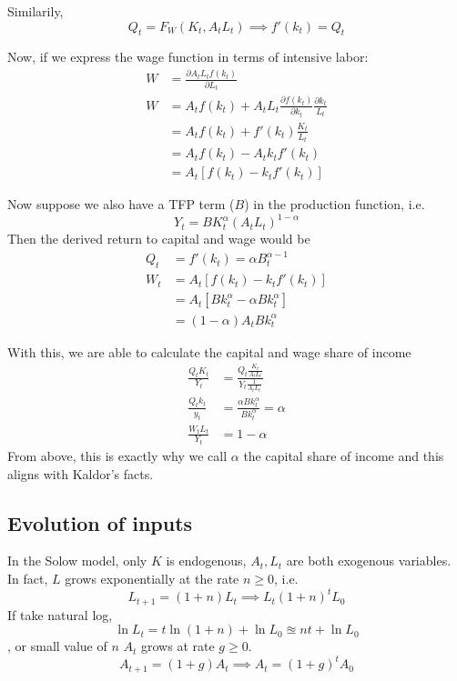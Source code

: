 \documentclass[twocolumn, fleqn]{article}
\begin{document}
			Similarily, \[Q_t = F_W(K_t,A_t L_t) \implies f'(k_t)=Q_t\]

			Now, if we express the wage function in terms of intensive labor:
			\begin{align*}
				W &= \frac{\partial A_t L_t f(k_t)}{\partial L_t}\\
				W &= A_t f(k_t) + A_t L_t \frac{\partial f(k_t)}{\partial k_t}\frac{\partial k_t}{L_t}\\
				&= A_t f(k_t) + f'(k_t) \frac{K_t}{L_t}\\
				&= A_t f(k_t) - A_t k_t f'(k_t)\\[4pt]
				&= A_t [f(k_t)-k_t f'(k_t)]
			\end{align*}

			Now suppose we also have a TFP term ($B$) in the production function, i.e.
			\[Y_t = B K_t^\alpha (A_t L_t)^{1-\alpha}\]
			Then the derived return to capital and wage would be
			\begin{align*}
				Q_t &= f'(k_t) = \alpha B_t ^{\alpha-1}\\[4pt]
				W_t &= A_t [f(k_t)-k_t f'(k_t)]\\
				&= A_t [B k_t^\alpha - \alpha B k_t^\alpha]\\
				&= (1-\alpha)A_t B k_t^{\alpha}
			\end{align*}

			With this, we are able to calculate the capital and wage share of income
			\begin{align*}
				\frac{Q_t K_t}{Y_t} &= \frac{Q_t \frac{K_t}{A_t L_t}}{Y_t \frac{1}{A_t L_t}}\\
				\frac{Q_t k_t}{y_t} &= \frac{\alpha B k_t^\alpha}{B k_t^\alpha} =\alpha\\[4pt]
				\frac{W_t L_t}{Y_t} &= 1-\alpha\
			\end{align*}
			From above, this is exactly why we call $\alpha$ the capital share of income and this aligns with
			Kaldor's facts.

		\subsection{Evolution of inputs}
			In the Solow model, only $K$ is endogenous, $A_t, L_t$ are both exogenous variables.
			In fact, $L$ grows exponentially at the rate $n\geq 0$, i.e.
			\[L_{t+1} = (1+n)L_t \implies L_t (1+n)^t L_0\]
			If take natural log,
			\[\ln L_t = t \ln(1+n)+\ln L_0 \approxeq nt + \ln L_0\],
			or small value of $n$
			$A_t$ grows at rate $g\geq 0$.
			\[A_{t+1}= (1+g)A_t \implies A_t = (1+g)^t A_0\]
\end{document}
